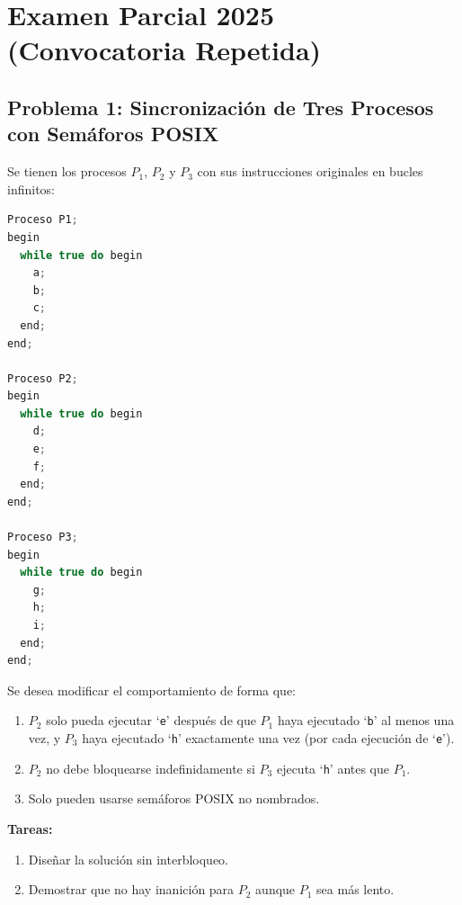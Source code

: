 \documentclass[11pt,a4paper,twoside,openright]{report}
\begin{document}
\tableofcontents
\newpage

\chapter{Examen Parcial 2025 (Convocatoria Repetida)}
\label{cap:examen2025}


\section{Problema 1: Sincronización de Tres Procesos con Semáforos POSIX}

\begin{ejercicio}
Se tienen los procesos $P_1$, $P_2$ y $P_3$ con sus instrucciones originales en bucles infinitos:

\begin{lstlisting}[language=C++]
Proceso P1;
begin
  while true do begin
    a;
    b;
    c;
  end;
end;

Proceso P2;
begin
  while true do begin
    d;
    e;
    f;
  end;
end;

Proceso P3;
begin
  while true do begin
    g;
    h;
    i;
  end;
end;
\end{lstlisting}

Se desea modificar el comportamiento de forma que:
\begin{enumerate}
    \item $P_2$ solo pueda ejecutar `\texttt{e}' después de que $P_1$ haya ejecutado `\texttt{b}' al menos una vez, y $P_3$ haya ejecutado `\texttt{h}' exactamente una vez (por cada ejecución de `\texttt{e}').
    \item $P_2$ no debe bloquearse indefinidamente si $P_3$ ejecuta `\texttt{h}' antes que $P_1$.
    \item Solo pueden usarse semáforos POSIX no nombrados.
\end{enumerate}
\textbf{Tareas:}
\begin{enumerate}[label=(\alph*)]
    \item Diseñar la solución sin interbloqueo.
    \item Demostrar que no hay inanición para $P_2$ aunque $P_1$ sea más lento.
\end{enumerate}
\end{ejercicio}
\end{document}
